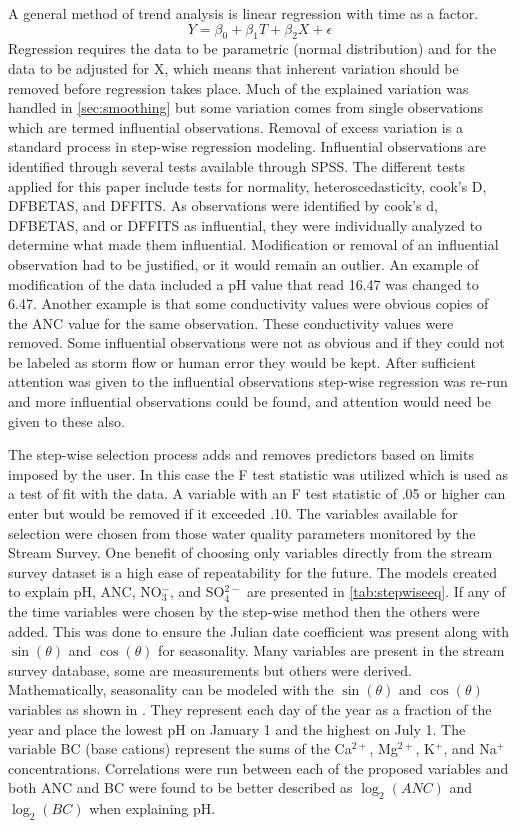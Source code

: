 A general method of trend analysis is linear regression with time as a factor.
\begin{equation} \label{eq:regression}
    Y={\beta_0 + \beta_1  T + \beta_2  X + \epsilon}
\end{equation}
Regression requires the data to be parametric (normal distribution) and for the data to be adjusted for X, which means that inherent variation should be removed before regression takes place.
Much of the explained variation was handled in \autoref{sec:smoothing} but some variation comes from single observations which are termed influential observations.
Removal of excess variation is a standard process in step-wise regression modeling.
Influential observations are identified through several tests available through SPSS.
The different tests applied for this paper include tests for normality, heteroscedasticity, cook's D, DFBETAS, and DFFITS. 
As observations were identified by cook's d, DFBETAS, and or DFFITS as influential, they were individually analyzed to determine what made them influential. 
Modification or removal of an influential observation had to be justified, or it would remain an outlier. 
An example of modification of the data included a pH value that read 16.47 was changed to 6.47. Another example is that some conductivity values were obvious copies of the ANC value for the same observation. 
These conductivity values were removed. 
Some influential observations were not as obvious and if they could not be labeled as storm flow or human error they would be kept.
After sufficient attention was given to the influential observations step-wise regression was re-run and more influential observations could be found, and attention would need be given to these also. 

The step-wise selection process adds and removes predictors based on limits imposed by the user.
In this case the F test statistic was utilized which is used as a test of fit with the data.
A variable with an F test statistic of .05 or higher can enter but would be removed if it exceeded .10. 
The variables available for selection were chosen from those water quality parameters monitored by the Stream Survey. 
One benefit of choosing only variables directly from the stream survey dataset is a high ease of repeatability for the future. 
The models created to explain pH, ANC, NO$_3^-$, and SO$_4^{2-}$ are presented in \autoref{tab:stepwiseeq}.
If any of the time variables were chosen by the step-wise method then the others were added.  
This was done to ensure the Julian date coefficient was present along with $\sin(\theta)$ and $\cos(\theta)$ for seasonality.  
Many variables are present in the stream survey database, some are measurements but others were derived.  
Mathematically, seasonality can be modeled with the $\sin(\theta)$ and $\cos(\theta)$ variables as shown in \citet{helsel1992statistical}. 
They represent each day of the year as a fraction of the year and place the lowest pH on January 1 and the highest on July 1.  
The variable BC (base cations) represent the sums of the Ca$^{2+}$, Mg$^{2+}$, K$^+$, and Na$^+$ concentrations.  
Correlations were run between each of the proposed variables  and both ANC and BC were found to be better described as $\log_2(ANC)$ and $\log_2(BC)$ when explaining pH.
 

